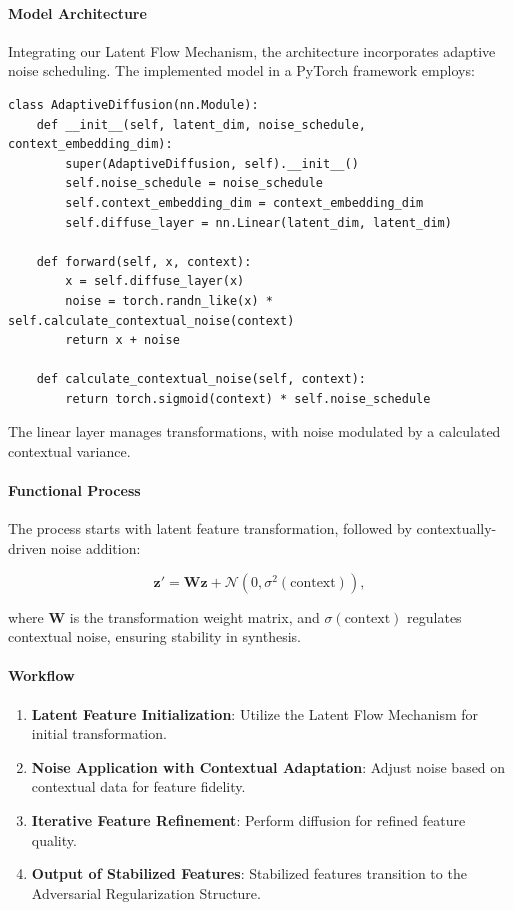 \paragraph{Model Architecture}
Integrating our Latent Flow Mechanism, the architecture incorporates adaptive noise scheduling. The implemented model in a PyTorch framework employs:

\begin{lstlisting}
class AdaptiveDiffusion(nn.Module):
    def __init__(self, latent_dim, noise_schedule, context_embedding_dim):
        super(AdaptiveDiffusion, self).__init__()
        self.noise_schedule = noise_schedule
        self.context_embedding_dim = context_embedding_dim
        self.diffuse_layer = nn.Linear(latent_dim, latent_dim)

    def forward(self, x, context):
        x = self.diffuse_layer(x)
        noise = torch.randn_like(x) * self.calculate_contextual_noise(context)
        return x + noise
    
    def calculate_contextual_noise(self, context):
        return torch.sigmoid(context) * self.noise_schedule
\end{lstlisting}

The linear layer manages transformations, with noise modulated by a calculated contextual variance.

\paragraph{Functional Process}
The process starts with latent feature transformation, followed by contextually-driven noise addition:

\[
\mathbf{z}' = \mathbf{W} \mathbf{z} + \mathcal{N}(0, \sigma^2(\text{context})),
\]

where \( \mathbf{W} \) is the transformation weight matrix, and \( \sigma(\text{context}) \) regulates contextual noise, ensuring stability in synthesis.

\paragraph{Workflow}
\begin{enumerate}
    \item \textbf{Latent Feature Initialization}: Utilize the Latent Flow Mechanism for initial transformation.
    \item \textbf{Noise Application with Contextual Adaptation}: Adjust noise based on contextual data for feature fidelity.
    \item \textbf{Iterative Feature Refinement}: Perform diffusion for refined feature quality.
    \item \textbf{Output of Stabilized Features}: Stabilized features transition to the Adversarial Regularization Structure.
\end{enumerate}

